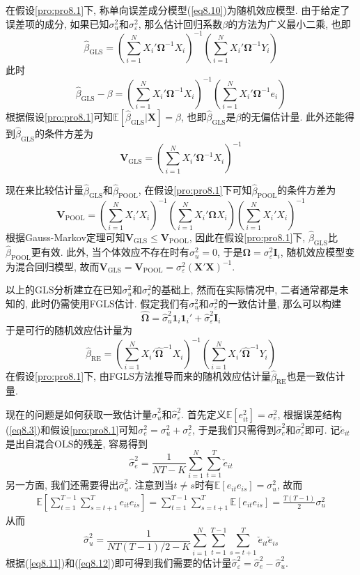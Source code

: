 \documentclass[cn, 12pt, math=mtpro2, bibstyle=apa, blue, twocol]{elegantbook}
\newcommand{\E}{\mathbb{E}}
\newcommand{\X}{\mathbold{X}}
\newcommand{\hb}{\hat{\beta}}
\newcommand{\V}{\mathbold{V}}
\newcommand{\BO}{\mathbold{\Omega}}
\begin{document}
在假设\ref{pro:pro8.1}下, 称单向误差成分模型(\ref{eq8.10})为随机效应模型. 由于给定了误差项的成分, 如果已知$\sigma_u^2$和$\sigma_\varepsilon^2$, 那么估计回归系数$\beta$的方法为广义最小二乘, 也即
$$\hb_{\text{GLS}}=\left(\sum_{i=1}^{N}X_i'\BO^{-1}X_i\right)^{-1}\left(\sum_{i=1}^{N}X_i'\BO^{-1}Y_i\right)$$
此时
$$\hb_{\text{GLS}}-\beta=\left(\sum_{i=1}^{N}X_i'\BO^{-1}X_i\right)^{-1}\left(\sum_{i=1}^{N}X_i'\BO^{-1}e_i\right)$$
根据假设\ref{pro:pro8.1}可知$\E[\hb_{\text{GLS}}|\X]=\beta$, 也即$\hb_{\text{GLS}}$是$\beta$的无偏估计量. 此外还能得到$\hb_{\text{GLS}}$的条件方差为
\begin{equation}\label{eq8.13}
  \V_{\text{GLS}}=\left(\sum_{i=1}^{N}X_i'\BO^{-1}X_i\right)^{-1}
\end{equation}

现在来比较估计量$\hb_{\text{GLS}}$和$\hb_{\text{POOL}}$, 在假设\ref{pro:pro8.1}下可知$\hb_{\text{POOL}}$的条件方差为
$$\V_{\text{POOL}}=\left(\sum_{i=1}^{N}X_i'X_i\right)^{-1}\left(\sum_{i=1}^{N}X_i'\BO X_i\right)\left(\sum_{i=1}^{N}X_i'X_i\right)^{-1}$$
根据Gauss-Markov定理可知$\V_{\text{GLS}}\leq\V_{\text{POOL}}$, 因此在假设\ref{pro:pro8.1}下, $\hb_{\text{GLS}}$比$\hb_{\text{POOL}}$更有效. 此外, 当个体效应不存在时有$\sigma_u^2=0$, 于是$\BO=\sigma_\varepsilon^2\mathbold{I}_i$, 随机效应模型变为混合回归模型, 故而$\V_{\text{GLS}}=\V_{\text{POOL}}=\sigma_\varepsilon^2(\X'\X)^{-1}$.

以上的GLS分析建立在已知$\sigma_u^2$和$\sigma_\varepsilon^2$的基础上, 然而在实际情况中, 二者通常都是未知的, 此时仍需使用FGLS估计. 假定我们有$\sigma_u^2$和$\sigma_\varepsilon^2$的一致估计量, 那么可以构建
$$\hat{\BO}=\hat{\sigma}_u^2\mathbf{1}_i\mathbf{1}_i'+\hat{\sigma}_\varepsilon^2\mathbold{I}_i$$
于是可行的随机效应估计量为
$$\hb_{\text{RE}}=\left(\sum_{i=1}^{N}X_i'\hat{\BO}^{-1}X_i\right)^{-1}\left(\sum_{i=1}^{N}X_i'\hat{\BO}^{-1}Y_i\right)$$
在假设\ref{pro:pro8.1}下, 由FGLS方法推导而来的随机效应估计量$\hb_{\text{RE}}$也是一致估计量.

现在的问题是如何获取一致估计量$\hat{\sigma}_u^2$和$\hat{\sigma}_\varepsilon^2$. 首先定义$\E[e_{it}^2]=\sigma_e^2$, 根据误差结构(\ref{eq8.3})和假设\ref{pro:pro8.1}可知$\sigma^2_e=\sigma_u^2+\sigma_\varepsilon^2$, 于是我们只需得到$\hat{\sigma}_e^2$和$\hat{\sigma}_\varepsilon^2$即可. 记$\check{e}_{it}$是出自混合OLS的残差, 容易得到
\begin{equation}\label{eq8.11}
  \hat{\sigma}_e^2=\frac{1}{NT-K}\sum_{i=1}^{N}\sum_{t=1}^T\check{e}_{it}
\end{equation}
另一方面, 我们还需要得出$\hat{\sigma}_u^2$. 注意到当$t\neq s$时有$\E[e_{it}e_{is}]=\sigma_u^2$, 故而
\begin{align*}
\E\left[\sum_{t=1}^{T-1}\sum_{s=t+1}^{T} e_{it}e_{is}\right]=\sum_{t=1}^{T-1}\sum_{s=t+1}^{T}\E[e_{it}e_{is}]=\frac{T(T-1)}{2}\sigma_u^2
\end{align*}
从而
\begin{equation}\label{eq8.12}
  \hat{\sigma}_u^2=\frac{1}{NT(T-1)/2-K}\sum_{i=1}^{N}\sum_{t=1}^{T-1}\sum_{s=t+1}^{T}\check{e}_{it}\check{e}_{is}
\end{equation}
根据(\ref{eq8.11})和(\ref{eq8.12})即可得到我们需要的估计量$\hat{\sigma}_\varepsilon^2=\hat{\sigma}_e^2-\hat{\sigma}_u^2$.
\end{document}
